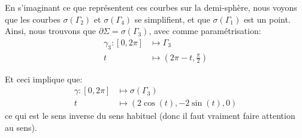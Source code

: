 \documentclass[a4paper]{article}
\begin{document}
{{        En s'imaginant ce que représentent ces courbes sur la demi-sphère, nous voyons que les courbes $\sigma\left(\Gamma_2\right)$ et $\sigma\left(\Gamma_4\right)$ se simplifient, et que $\sigma\left(\Gamma_1\right)$ est un point. Ainsi, nous trouvons que $\partial \Sigma = \sigma\left(\Gamma_3\right)$, avec comme paramétrisation: 
        \[\begin{split}
        \gamma_3: \left[0, 2\pi\right] &\longmapsto \Gamma_3 \\
        t &\longmapsto \left(2\pi - t, \frac{\pi}{2}\right)
        \end{split}\]
        
        Et ceci implique que:
        \[\begin{split}
        \gamma: \left[0, 2\pi\right] &\longmapsto \sigma\left(\Gamma_3\right) \\
        t &\longmapsto \left(2\cos\left(t\right), -2\sin\left(t\right), 0\right)
        \end{split}\]
        ce qui est le sens inverse du sens habituel (donc il faut vraiment faire attention au sens).
    }

}
\end{document}
